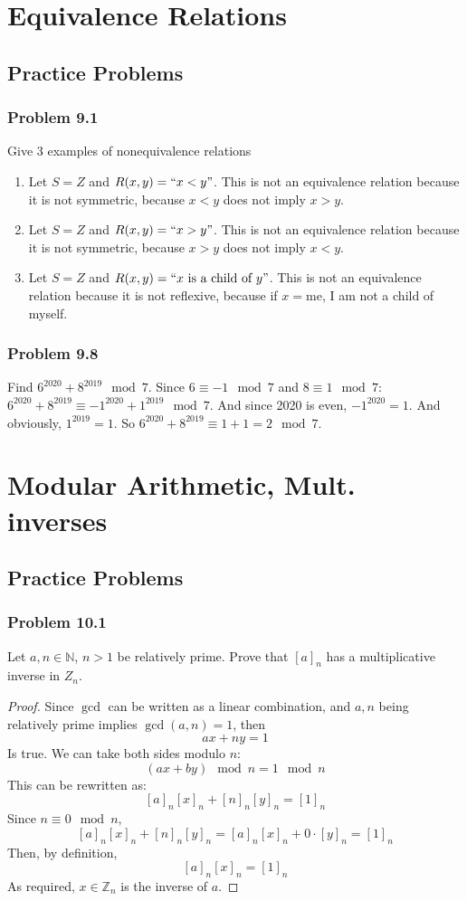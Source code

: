 \documentclass[hidelinks,12pt]{article}
\newcommand{\N}{\mathbb{N}}
\newcommand{\Z}{\mathbb{Z}}
\begin{document}
\section{Equivalence Relations}
\subsection{Practice Problems}
\subsubsection{Problem 9.1}
Give 3 examples of nonequivalence relations
\begin{enumerate}
    \item Let $S=Z$ and $R(x,y)=``x<y"$. This is not an equivalence relation because it is not symmetric, because $x<y$ does not imply $x>y$.
    \item Let $S=Z$ and $R(x,y)=``x>y"$. This is not an equivalence relation because it is not symmetric, because $x>y$ does not imply $x<y$.
    \item Let $S=Z$ and $R(x,y)=``x\text{ is a child of }y"$. This is not an equivalence relation because it is not reflexive, because if $x=\text{me}$, I am not a child of myself.
\end{enumerate}
\subsubsection{Problem 9.8}
Find $6^{2020}+8^{2019}\mod{7}$.
\newline Since $6\equiv-1\mod{7}$ and $8\equiv1\mod{7}$: $6^{2020}+8^{2019}\equiv-1^{2020}+1^{2019}\mod{7}$. And since 2020 is even, $-1^{2020}=1$. And obviously, $1^{2019}=1$. So $6^{2020}+8^{2019}\equiv1+1=2\mod{7}$.
\newpage
\section{Modular Arithmetic, Mult. inverses}
\subsection{Practice Problems}
\subsubsection{Problem 10.1}
Let $a,n\in\N$, $n>1$ be relatively prime. Prove that $[a]_n$ has a multiplicative inverse in $Z_n$.
\begin{proof}
Since $\gcd$ can be written as a linear combination, and $a,n$ being relatively prime implies $\gcd{(a,n)=1}$, then $$ax+ny=1$$ Is true. We can take both sides modulo $n$:$$(ax+by)\mod{n}=1\mod{n}$$This can be rewritten as:$$[a]_n[x]_n+[n]_n[y]_n=[1]_n$$Since $n\equiv0\mod{n}$, $$[a]_n[x]_n+[n]_n[y]_n=[a]_n[x]_n+0\cdot[y]_n=[1]_n$$Then, by definition, $$[a]_n[x]_n=[1]_n$$As required, $x\in\Z_n$ is the inverse of $a$.
\end{proof}
\end{document}
